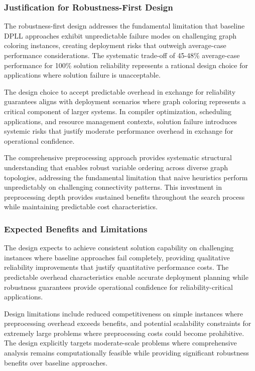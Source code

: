 \subsubsection{Justification for Robustness-First Design}

The robustness-first design addresses the fundamental limitation that baseline DPLL approaches exhibit unpredictable failure modes on challenging graph coloring instances, creating deployment risks that outweigh average-case performance considerations. The systematic trade-off of 45-48\% average-case performance for 100\% solution reliability represents a rational design choice for applications where solution failure is unacceptable.

The design choice to accept predictable overhead in exchange for reliability guarantees aligns with deployment scenarios where graph coloring represents a critical component of larger systems. In compiler optimization, scheduling applications, and resource management contexts, solution failure introduces systemic risks that justify moderate performance overhead in exchange for operational confidence.

The comprehensive preprocessing approach provides systematic structural understanding that enables robust variable ordering across diverse graph topologies, addressing the fundamental limitation that naive heuristics perform unpredictably on challenging connectivity patterns. This investment in preprocessing depth provides sustained benefits throughout the search process while maintaining predictable cost characteristics.

\subsubsection{Expected Benefits and Limitations}

The design expects to achieve consistent solution capability on challenging instances where baseline approaches fail completely, providing qualitative reliability improvements that justify quantitative performance costs. The predictable overhead characteristics enable accurate deployment planning while robustness guarantees provide operational confidence for reliability-critical applications.

Design limitations include reduced competitiveness on simple instances where preprocessing overhead exceeds benefits, and potential scalability constraints for extremely large problems where preprocessing costs could become prohibitive. The design explicitly targets moderate-scale problems where comprehensive analysis remains computationally feasible while providing significant robustness benefits over baseline approaches.